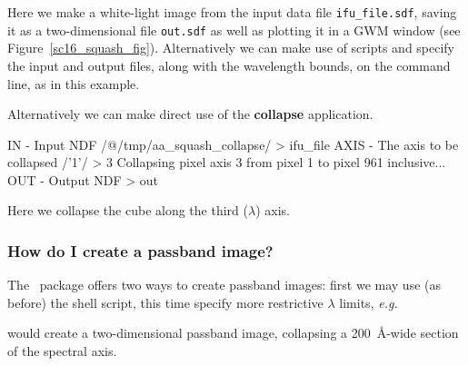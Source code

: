 \documentclass[twoside,11pt]{starlink}
\providecommand{\DATACUBE}{{\footnotesize DATACUBE}\normalsize}
\providecommand{\DATACUBEref}{\xref{\DATACUBE}{sun237}{}}
\begin{document}

Here we make a white-light image from the input data file \texttt{ifu\_file.sdf}, saving it as a two-dimensional  file \texttt{out.sdf} as well as
plotting it in a GWM window (see
Figure~\ref{sc16_squash_fig}).
Alternatively we can make use of scripts  and specify the input and output files, along
with the wavelength bounds, on the command line, as in this example.

\begin{small}
\begin{terminalv}
\end{terminalv}
\end{small}

Alternatively we can make direct use of the \textbf{collapse} application.

\begin{small}
\begin{terminalv}
IN - Input NDF /@/tmp/aa_squash_collapse/ > ifu_file
AXIS - The axis to be collapsed /'1'/ > 3
  Collapsing pixel axis 3 from pixel 1 to pixel 961 inclusive...
OUT - Output NDF > out
%
\end{terminalv}
\end{small}

Here we collapse the cube along the third ($\lambda$) axis.

\subsubsection{How do I create a passband image?}

The \DATACUBEref\ package offers two ways to create passband images:
first we may use (as before) the 
shell script, this time specify more restrictive $\lambda$ limits,
\emph{e.g.}\

\begin{small}
\begin{terminalv}
\end{terminalv}
\end{small}

would create a two-dimensional passband image, collapsing a
200~\AA-wide section of the spectral axis.

\end{document}
